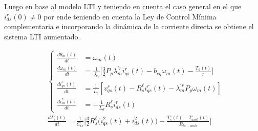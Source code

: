 \documentclass[blue,fullpaper]{ludusofficial}  %
\begin{document}
\FloatBarrier
Luego en base al modelo LTI y teniendo en cuenta el caso general en el  que $i^r_{ds}(0)\neq0$ por ende teniendo en cuenta la Ley de Control Mínima complementaria e incorporando la dinámica de la corriente directa se obtiene el sistema LTI aumentado.

\begin{equation}
\label{eq:modelo-lti-aumentado}
\begin{aligned}
& \left\{
    \begin{aligned}
        \frac{d\theta_m(t)}{dt} &= \omega_m(t) \\[1.5ex]
        \frac{d\omega_{m}(t)}{dt} &= \frac{1}{J_{eq}} \Bigg[ \frac{3}{2}P_{p} \lambda_{m}^{'r} i_{qs}^{r}(t) - b_{eq}  \omega_{m}(t) - \frac{T_d(t)}{r} \Bigg]  \\[1.5ex]
        \frac{di_{qs}^{r}(t)}{dt}  &= \frac{1}{L_{q} } \left[ v_{qs}^{r}(t) - R_{s}^{\ell} i_{qs}^{r}(t) - \lambda_{m}^{'r}P_{p} \omega_{m}(t) \right] \\[1.5ex]
        \frac{di_{ds}^{r}(t)}{dt} &= -\frac{1}{L_{d}} R_{s}^{\ell} i_{ds}^{r}(t)
    \end{aligned}
\right. \\[2ex]
& \frac{dT_{s}^{\circ}(t)}{dt} = \frac{1}{C_{ts}} \Bigg[ \frac{3}{2} R_{s}^{\ell}\Big(i_{qs}^{2}(t) +i_{ds}^{2}(t)\Big)  - \frac{T_{s}^{\circ}(t) - T_{amb}^{\circ}(t)}{R_{ts-amb}} \Bigg]
\end{aligned}
\end{equation}
\end{document}
